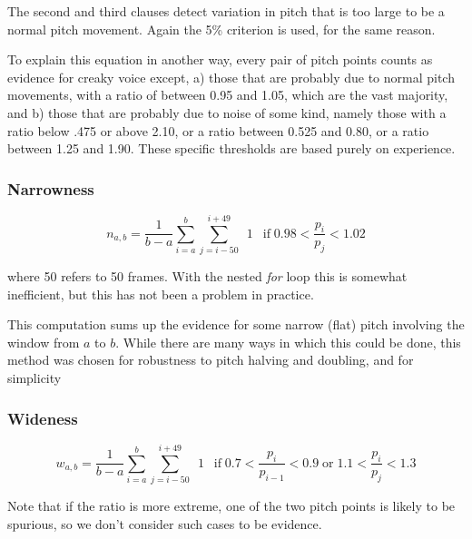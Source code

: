 \documentclass[11pt]{article}
\begin{document}
The second and third clauses detect variation in pitch that is too
large to be a normal pitch movement.  Again the 5\% criterion is used,
for the same reason.  

To explain this equation in another way, every pair of pitch points
counts as evidence for creaky voice except, a) those that are probably
due to normal pitch movements, with a ratio of between 0.95 and 1.05,
which are the vast majority, and b) those that are probably due to
noise of some kind, namely those with a ratio below .475 or above
2.10, or a ratio between 0.525 and 0.80, or a ratio between 1.25 and
1.90.  These specific thresholds are based purely on experience.

\subsubsection{Narrowness}

\begin{equation}
n_{a,b} = \frac{1}{b-a} \sum\limits_{i=a}^b \sum\limits_{j=i-50}^{i+49} \enspace 1 \enspace \operatorname{if} 0.98 <  \frac{p_i}{p_j} < 1.02 
\end{equation}

where 50 refers to 50 frames.  With the nested {\em for} loop this is
somewhat inefficient, but this has not been a problem in practice.

This computation sums up the evidence for some narrow (flat) pitch
involving the window from $a$ to $b$.  While there are many ways in
which this could be done, this method was chosen for
robustness to pitch halving and doubling, and for simplicity


\subsubsection{Wideness}

\begin{equation}
w_{a,b} = \frac{1}{b-a} \sum\limits_{i=a}^b \sum\limits_{j=i-50}^{i+49} \enspace 1 \enspace \operatorname{if} 0.7 <  \frac{p_i}{p_{i-1}} < 0.9 \operatorname{or} 1.1 <  \frac{p_i}{p_{j}} < 1.3
\end{equation}

Note that if the ratio is more extreme, one of the two pitch points is
likely to be spurious, so we don't consider such cases to be evidence.
\end{document}

